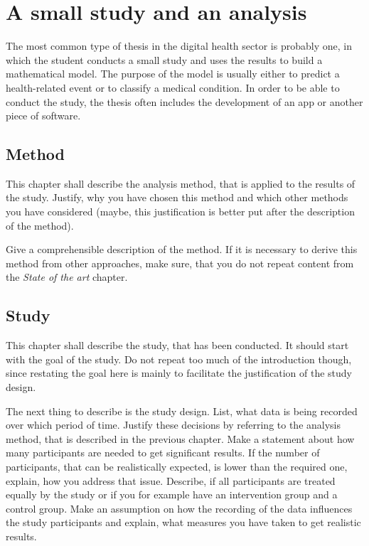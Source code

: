 \section{A small study and an analysis}
The most common type of thesis in the digital health sector is probably one, in which the student conducts a small study and uses the results to build a mathematical model.
The purpose of the model is usually either to predict a health-related event or to classify a medical condition.
In order to be able to conduct the study, the thesis often includes the development of an app or another piece of software.

\subsection{Method}
This chapter shall describe the analysis method, that is applied to the results of the study.
Justify, why you have chosen this method and which other methods you have considered (maybe, this justification is better put after the description of the method).

Give a comprehensible description of the method.
If it is necessary to derive this method from other approaches, make sure, that you do not repeat content from the \textit{State of the art} chapter.

\subsection{Study}
This chapter shall describe the study, that has been conducted.
It should start with the goal of the study.
Do not repeat too much of the introduction though, since restating the goal here is mainly to facilitate the justification of the study design.

The next thing to describe is the study design.
List, what data is being recorded over which period of time.
Justify these decisions by referring to the analysis method, that is described in the previous chapter.
Make a statement about how many participants are needed to get significant results.
If the number of participants, that can be realistically expected, is lower than the required one, explain, how you address that issue.
Describe, if all participants are treated equally by the study or if you for example have an intervention group and a control group.
Make an assumption on how the recording of the data influences the study participants and explain, what measures you have taken to get realistic results.

